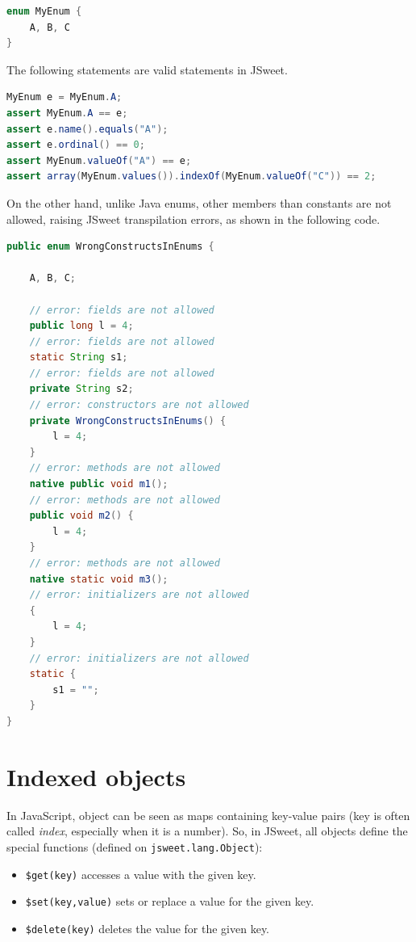 \documentclass[a4paper]{report}
\begin{document}
\begin{lstlisting}[language=Java]
enum MyEnum {
	A, B, C
}
\end{lstlisting}

The following statements are valid statements in JSweet.

\begin{lstlisting}[language=Java]
MyEnum e = MyEnum.A;
assert MyEnum.A == e;
assert e.name().equals("A");
assert e.ordinal() == 0;
assert MyEnum.valueOf("A") == e;
assert array(MyEnum.values()).indexOf(MyEnum.valueOf("C")) == 2;
\end{lstlisting}

On the other hand, unlike Java enums, other members than constants are not allowed, raising JSweet transpilation errors, as shown in the following code.

\begin{lstlisting}[language=Java]
public enum WrongConstructsInEnums {

	A, B, C;
	
	// error: fields are not allowed
	public long l = 4;
	// error: fields are not allowed
	static String s1;
	// error: fields are not allowed
	private String s2;
	// error: constructors are not allowed	
	private WrongConstructsInEnums() {
		l = 4;
	}
	// error: methods are not allowed	
	native public void m1();
	// error: methods are not allowed
	public void m2() {
		l = 4;
	}
	// error: methods are not allowed
	native static void m3();
	// error: initializers are not allowed
	{
		l = 4;
	}
	// error: initializers are not allowed
	static {
		s1 = "";
	}
}
\end{lstlisting}

\section{Indexed objects}

In JavaScript, object can be seen as maps containing key-value pairs (key is often called \emph{index}, especially when it is a number). So, in JSweet, all objects define the special functions (defined on \texttt{jsweet.lang.Object}):

\begin{itemize}
\item \texttt{\$get(key)} accesses a value with the given key.
\item \texttt{\$set(key,value)} sets or replace a value for the given key.
\item \texttt{\$delete(key)} deletes the value for the given key.
\end{itemize}
\end{document}

